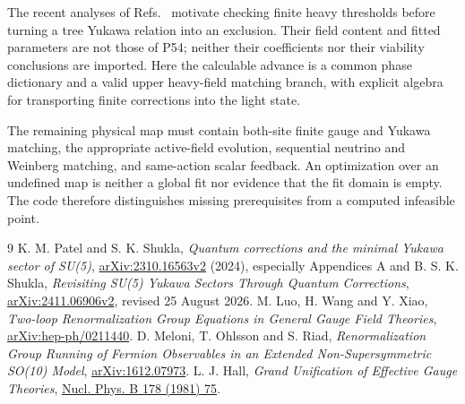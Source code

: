 \documentclass[11pt]{article}
\begin{document}
The recent analyses of Refs.~\cite{PatelShukla,Shukla} motivate checking
finite heavy thresholds before turning a tree Yukawa relation into an
exclusion. Their field content and fitted parameters are not those of P54;
neither their coefficients nor their viability conclusions are imported.
Here the calculable advance is a common phase dictionary and a valid
upper heavy-field matching branch, with explicit algebra for transporting
finite corrections into the light state.

The remaining physical map must contain both-site finite gauge and Yukawa
matching, the appropriate active-field evolution, sequential neutrino and
Weinberg matching, and same-action scalar feedback. An optimization over
an undefined map is neither a global fit nor evidence that the fit domain
is empty. The code therefore distinguishes missing prerequisites from a
computed infeasible point.

\begin{thebibliography}{9}
 K. M. Patel and S. K. Shukla,
\emph{Quantum corrections and the minimal Yukawa sector of SU(5)},
\href{https://arxiv.org/abs/2310.16563}{arXiv:2310.16563v2} (2024),
especially Appendices A and B.
 S. K. Shukla,
\emph{Revisiting SU(5) Yukawa Sectors Through Quantum Corrections},
\href{https://arxiv.org/abs/2411.06906}{arXiv:2411.06906v2},
revised 25 August 2026.
 M. Luo, H. Wang and Y. Xiao,
\emph{Two-loop Renormalization Group Equations in General Gauge Field Theories},
\href{https://arxiv.org/abs/hep-ph/0211440}{arXiv:hep-ph/0211440}.
 D. Meloni, T. Ohlsson and S. Riad,
\emph{Renormalization Group Running of Fermion Observables in an Extended
Non-Supersymmetric SO(10) Model},
\href{https://arxiv.org/abs/1612.07973}{arXiv:1612.07973}.
 L. J. Hall, \emph{Grand Unification of Effective Gauge Theories},
\href{https://doi.org/10.1016/0550-3213(81)90498-3}{Nucl. Phys. B 178 (1981) 75}.
\end{thebibliography}
\end{document}
